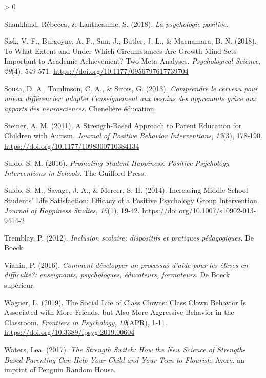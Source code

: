 \documentclass[
  french,
]{article}
\newlength{\cslhangindent}
\newenvironment{CSLReferences}[2] %
 {%
  \setlength{\parindent}{0pt}
  \ifodd #1 \everypar{\setlength{\hangindent}{\cslhangindent}}\ignorespaces\fi
  \ifnum #2 > 0
  \setlength{\parskip}{#2\baselineskip}
  \fi
 }%
 {}
\begin{document}
\begin{CSLReferences}{1}{0}
\leavevmode\hypertarget{ref-shankland2018b}{}%
Shankland, Rébecca, \& Lantheaume, S. (2018). \emph{{La psychologie positive}}.

\leavevmode\hypertarget{ref-sisk2018}{}%
Sisk, V. F., Burgoyne, A. P., Sun, J., Butler, J. L., \& Macnamara, B. N. (2018). To {What Extent} and {Under Which Circumstances Are Growth Mind}-{Sets Important} to {Academic Achievement}? {Two Meta}-{Analyses}. \emph{Psychological Science}, \emph{29}(4), 549‑571. \url{https://doi.org/10.1177/0956797617739704}

\leavevmode\hypertarget{ref-sousa2013}{}%
Sousa, D. A., Tomlinson, C. A., \& Sirois, G. (2013). \emph{{Comprendre le cerveau pour mieux différencier: adapter l'enseignement aux besoins des apprenants grâce aux apports des neurosciences}}. {Chenelière éducation}.

\leavevmode\hypertarget{ref-steiner2011}{}%
Steiner, A. M. (2011). A Strength-Based Approach to Parent Education for Children with Autism. \emph{Journal of Positive Behavior Interventions}, \emph{13}(3), 178‑190. \url{https://doi.org/10.1177/1098300710384134}

\leavevmode\hypertarget{ref-suldo2016a}{}%
Suldo, S. M. (2016). \emph{Promoting Student Happiness: Positive Psychology Interventions in Schools}. {The Guilford Press}.

\leavevmode\hypertarget{ref-suldo2014}{}%
Suldo, S. M., Savage, J. A., \& Mercer, S. H. (2014). Increasing {Middle School Students}' {Life Satisfaction}: {Efficacy} of a {Positive Psychology Group Intervention}. \emph{Journal of Happiness Studies}, \emph{15}(1), 19‑42. \url{https://doi.org/10.1007/s10902-013-9414-2}

\leavevmode\hypertarget{ref-tremblay2012}{}%
Tremblay, P. (2012). \emph{{Inclusion scolaire: dispositifs et pratiques pédagogiques}}. {De Boeck}.

\leavevmode\hypertarget{ref-vianin2016}{}%
Vianin, P. (2016). \emph{{Comment développer un processus d'aide pour les élèves en difficulté?: enseignants, psychologues, éducateurs, formateurs}}. {De Boeck supérieur}.

\leavevmode\hypertarget{ref-wagner2019a}{}%
Wagner, L. (2019). The Social Life of Class Clowns: {Class} Clown Behavior Is Associated with More Friends, but Also More Aggressive Behavior in the Classroom. \emph{Frontiers in Psychology}, \emph{10}(APR), 1‑11. \url{https://doi.org/10.3389/fpsyg.2019.00604}

\leavevmode\hypertarget{ref-waters2017}{}%
Waters, Lea. (2017). \emph{The Strength Switch: How the New Science of Strength-Based Parenting Can Help Your Child and Your Teen to Flourish}. {Avery, an imprint of Penguin Random House}.


\end{CSLReferences}
\end{document}
